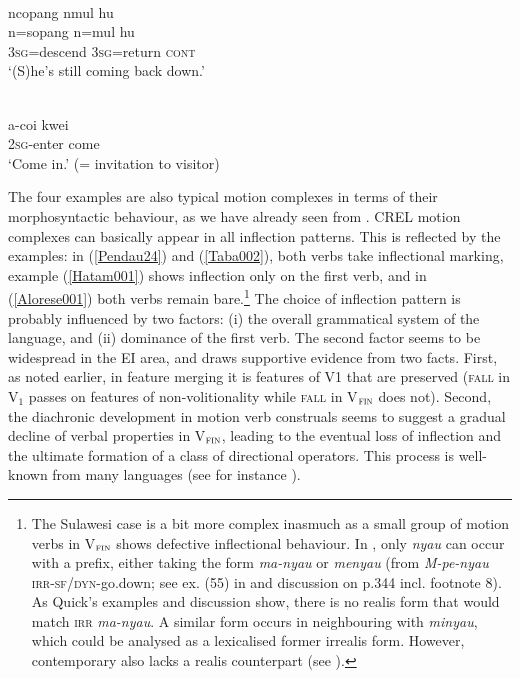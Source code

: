 \ea \label{Taba002}
\\
\glll ncopang nmul hu \\
n=sopang n=mul hu \\
\textsc{3}\textsc{sg}=descend \textsc{3}\textsc{sg}=return \textsc{cont} \\
\glft `(S)he's still coming back down.'\\ 
\z

\ea \label{Hatam001}
\\
\gll a-coi kwei \\
\textsc{2}\textsc{sg}-enter come \\
\glft `Come in.' (= invitation to visitor)\\ 
\z

The four examples are also typical motion complexes in terms of their morphosyntactic behaviour, as we have already seen from . CREL motion complexes can basically appear in all inflection patterns. This is reflected by the examples: in (\ref{Pendau24}) and (\ref{Taba002}), both verbs take inflectional marking, example (\ref{Hatam001}) shows inflection only on the first verb, and in  (\ref{Alorese001}) both verbs remain bare.\footnote{The Sulawesi case is a bit more complex inasmuch as a small group of motion verbs in V$_{\textsc{fin}}$ shows defective inflectional behaviour. In , only \textit{nyau} can occur with a prefix, either taking the form \textit{ma-nyau} or \textit{menyau} (from \textit{M-pe-nyau} \textsc{irr}-\textsc{sf/dyn}-go.down; see ex. (55) in \citealt[342]{Quick2007} and discussion on p.344 incl. footnote 8). As Quick's examples and discussion show, there is no realis form that would match \textsc{irr} \textit{ma-nyau}. A similar form occurs in neighbouring  with \textit{minyau}, which could be analysed as a lexicalised former irrealis form. However, contemporary  also lacks a realis counterpart (see \citealt[136]{mayani2013grammar}).} The choice of inflection pattern is probably influenced by two factors: (i) the overall grammatical system of the language, and (ii) dominance of the first verb. The second factor seems to be widespread in the EI area, and draws supportive evidence from two facts. First, as noted earlier, in feature merging it is features of V1 that are preserved (\textsc{fall} in V$_{1}$ passes on features of non-volitionality while \textsc{fall} in V$_{\textsc{fin}}$ does not). Second, the diachronic development in motion verb construals seems to suggest a gradual decline of verbal properties in V$_{\textsc{fin}}$, leading to the eventual loss of inflection and the ultimate formation of a class of directional operators. This process is well-known from many languages (see for instance \citealt[31]{Aikhenvald2006}).

